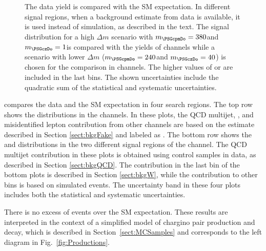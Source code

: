 \begin{figure}[!htb]
\caption{The data yield is compared with the SM expectation. In different signal regions,
when a background estimate from data is available, it is used instead of simulation, as described in the text. The signal distribution for a high $\Delta m$ scenario with ${m}_{\PSGcpmDo} = 380$\GeV and ${m}_{\PSGczDo} = 1$\GeV is compared with the yields of \leptonTau channels while a scenario with lower $\Delta m$ (${m}_{\PSGcpmDo} = 240$\GeV and ${m}_{\PSGczDo} = 40$\GeV) is chosen for the comparison in \tauTau channels. The higher values of \mttwo or \SumMT are included in the last bins. The shown uncertainties include the quadratic sum of the statistical and systematic uncertainties.}
\label{fig:yield_final}
\end{figure}
compares the data and the SM expectation in four search regions. The top row
shows the \mttwo distributions in the \leptonTau channels.
In these plots, the QCD multijet, \wjets, and misidentified lepton contribution from other channels
are based on the estimate described in Section \ref{sect:bkgFake} and labeled as \wjets.
The bottom row shows the \mttwo and \SumMT distributions in the two different signal regions of the \tauTau channel.
The QCD multijet contribution in these plots is obtained using control samples in data, as described in
Section \ref{sect:bkgQCD}. The \wjets contribution in
the last bin of the bottom plots is described in Section \ref{sect:bkgW}, while the contribution to other bins is based on simulated events.
The uncertainty band in these four plots includes both the statistical and systematic uncertainties.

There is no excess of events over the SM expectation.  These results are interpreted in the context
of a simplified model of chargino pair production and decay, which is described in Section~\ref{sect:MCSamples} and corresponds
to the left diagram in Fig.~\ref{fig:Productions}.

